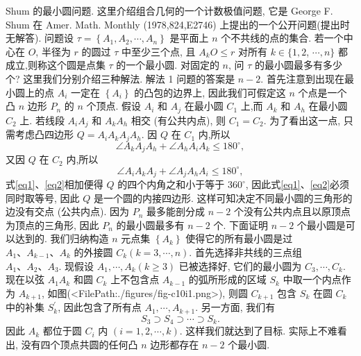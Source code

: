 
Shum 的最小圆问题.
这里介绍组合几何的一个计数极值问题, 它是 George F. Shum 在 Amer. Math. Monthly (1978,824,E2746) 上提出的一个公开问题(提出时无解答).
问题设 $\tau=\left\{A_1, A_2, \cdots, A_n\right\}$ 是平面上 $n$ 个不共线的点的集合.
若一个中心在 $O$, 半径为 $r$ 的圆过 $\tau$ 中至少三个点, 且 $A_k O \leqslant r$ 对所有 $k \in\{1,2$, $\cdots, n\}$ 都成立,则称这个圆是点集 $\tau$ 的一个最小圆.
对固定的 $n$, 问 $\tau$ 的最小圆最多有多少个?
这里我们分别介绍三种解法.
解法 1 问题的答案是 $n-2$.
首先注意到出现在最小圆上的点 $A_i$ 一定在 $\left\{A_i\right\}$ 的凸包的边界上, 因此我们可假定这 $n$ 个点是一个凸 $n$ 边形 $P_n$ 的 $n$ 个顶点.
假设 $A_i$ 和 $A_j$ 在最小圆 $C_1$ 上,而 $A_k$ 和 $A_h$ 在最小圆 $C_2$ 上.
若线段 $A_i A_j$ 和 $A_k A_h$ 相交 (有公共内点), 则 $C_1=C_2$. 为了看出这一点, 只需考虑凸四边形 $Q=A_i A_k A_j A_h$. 因 $Q$ 在 $C_1$ 内,所以
$$
\angle A_k A_j A_h+\angle A_h A_i A_k \leqslant 180^{\circ}, \label{eq1}
$$
又因 $Q$ 在 $C_2$ 内,所以
$$
\angle A_i A_k A_j+\angle A_j A_h A_i \leqslant 180^{\circ}, \label{eq2}
$$
式\ref{eq1}、\ref{eq2}相加便得 $Q$ 的四个内角之和小于等于 $360^{\circ}$, 因此式\ref{eq1}、\ref{eq2}必须同时取等号, 因此 $Q$ 是一个圆的内接四边形.
这样可知决定不同最小圆的三角形的边没有交点 (公共内点). 因为 $P_n$ 最多能剖分成 $n-2$ 个没有公共内点且以原顶点为顶点的三角形, 因此 $P_n$ 的最小圆最多有 $n-2$ 个.
下面证明 $n-2$ 个最小圆是可以达到的.
我们归纳构造 $n$ 元点集 $\left\{A_k\right\}$ 使得它的所有最小圆是过 $A_1 、 A_{k-1} 、 A_k$ 的外接圆 $C_k(k=3, \cdots, n)$. 首先选择非共线的三点组 $A_1 、 A_2 、 A_3$. 现假设 $A_1, \cdots, A_k(k \geqslant 3)$ 已被选择好, 它们的最小圆为 $C_3, \cdots, C_k$. 现在以弦 $A_1 A_k$ 和圆 $C_k$ 上不包含点 $A_{k-1}$ 的弧所形成的区域 $S_k$ 中取一个内点作为 $A_{k+1}$, 如图(<FilePath:./figures/fig-c10i1.png>), 则圆 $C_{k+1}$ 包含 $S_k$ 在圆 $C_k$ 中的补集 $S_k^{\prime}$, 因此包含了所有点 $A_1, \cdots, A_{k+1}$. 另一方面, 我们有
$$
S_3 \supset S_4 \supset \cdots \supset S_k .
$$
因此 $A_k$ 都位于圆 $C_i$ 内 $(i=1,2, \cdots, k)$. 这样我们就达到了目标.
实际上不难看出, 没有四个顶点共圆的任何凸 $n$ 边形都存在 $n-2$ 个最小圆.



